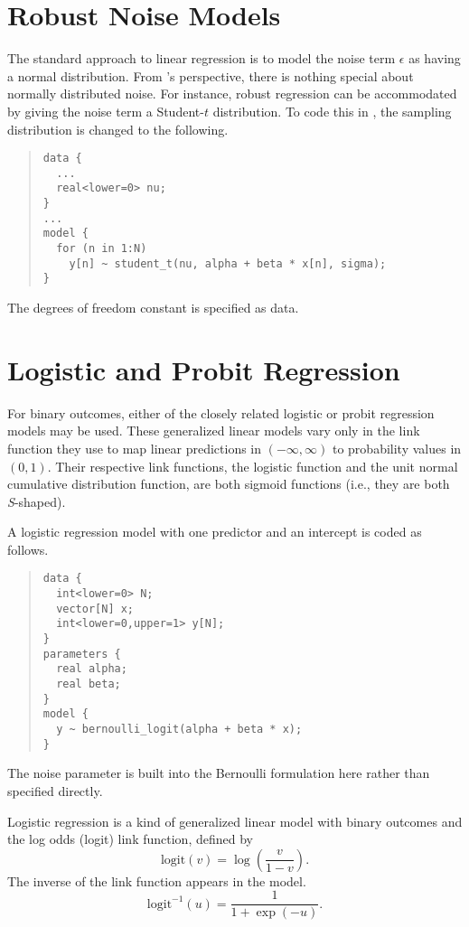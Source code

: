 \section{Robust Noise Models}

The standard approach to linear regression is to model the noise
term $\epsilon$ as having a normal distribution.  From \Stan's
perspective, there is nothing special about normally distributed
noise.  For instance, robust regression can be accommodated by giving
the noise term a Student-$t$ distribution.  To code this in \Stan, the
sampling distribution is changed to the following.
%
\begin{quote}
\begin{Verbatim}[fontsize=\small]
data {
  ...
  real<lower=0> nu;
}
...
model {
  for (n in 1:N)
    y[n] ~ student_t(nu, alpha + beta * x[n], sigma);
}
\end{Verbatim}
\end{quote}
%
The degrees of freedom constant  is specified as data.

\section{Logistic and Probit Regression}\label{logistic-probit-regression.section}

For binary outcomes, either of the closely related logistic or probit
regression models may be used.  These generalized linear models vary
only in the link function they use to map linear predictions in
$(-\infty,\infty)$ to probability values in $(0,1)$.  Their respective
link functions, the logistic function and the unit normal cumulative distribution
function, are both sigmoid functions (i.e., they are both {\it S}-shaped).

A logistic regression model with one predictor and an intercept is coded as
follows.
%
\begin{quote}
\begin{Verbatim}[fontsize=\small]
data {
  int<lower=0> N;
  vector[N] x;
  int<lower=0,upper=1> y[N];
}
parameters {
  real alpha;
  real beta;
}
model {
  y ~ bernoulli_logit(alpha + beta * x);
} 
\end{Verbatim}
\end{quote}
%
The noise parameter is built into the Bernoulli formulation here
rather than specified directly.  

Logistic regression is a kind of generalized linear model with binary
outcomes and the log odds (logit) link function, defined by
%
\[
\mbox{logit}(v) = \log \left( \frac{v}{1-v} \right).
\]
%
The inverse of the link function appears in the model.  
%
\[
\mbox{logit}^{-1}(u) = \frac{1}{1 + \exp(-u)}.
\]
%

